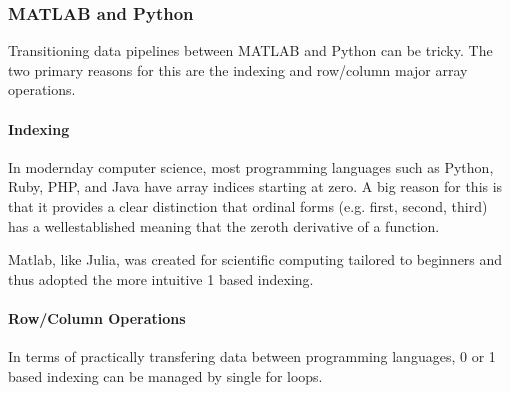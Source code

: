 \documentclass[letterpaper,10pt,english]{sphinxmanual}
\begin{document}
\begin{sphinxVerbatim}[commandchars=\\\{\}]

\end{sphinxVerbatim}


\subsubsection{MATLAB and Python}
\label{\detokenize{user_guide/tips_tricks:matlab-and-python}}
\sphinxAtStartPar
Transitioning data pipelines between MATLAB and Python can be tricky. The two primary reasons for this are the indexing and row/column major array operations.


\paragraph{Indexing}
\label{\detokenize{user_guide/tips_tricks:indexing}}
\sphinxAtStartPar
In modern\sphinxhyphen{}day computer science, most programming languages such as Python, Ruby, PHP, and Java have array indices starting at zero.
A big reason for this is that it provides a clear distinction that ordinal forms (e.g. first, second, third) has a well\sphinxhyphen{}established meaning that the zeroth derivative of a function.

\sphinxAtStartPar
Matlab, like Julia, was created for scientific computing tailored to beginners and thus adopted the more intuitive 1 based indexing.


\paragraph{Row/Column Operations}
\label{\detokenize{user_guide/tips_tricks:row-column-operations}}
\sphinxAtStartPar
In terms of practically transfering data between programming languages, 0 or 1 based indexing can be managed by single  for loops.
\end{document}
